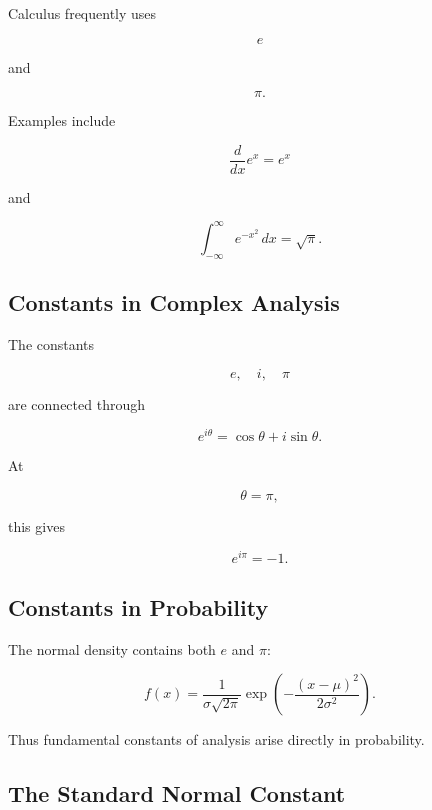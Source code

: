 Calculus frequently uses

\[
\boxed{
e
}
\]

and

\[
\boxed{
\pi.
}
\]

Examples include

\[
\boxed{
\frac{d}{dx}e^x=e^x
}
\]

and

\[
\boxed{
\int_{-\infty}^{\infty}
e^{-x^2}\,dx
=
\sqrt{\pi}.
}
\]

\subsection{Constants in Complex Analysis}
\label{subsec:constants-in-complex-analysis}

The constants

\[
\boxed{
e,
\quad
i,
\quad
\pi
}
\]

are connected through

\[
\boxed{
e^{i\theta}
=
\cos\theta+i\sin\theta.
}
\]

At

\[
\theta=\pi,
\]

this gives

\[
\boxed{
e^{i\pi}=-1.
}
\]

\subsection{Constants in Probability}
\label{subsec:constants-in-probability}

The normal density contains both \(e\) and \(\pi\):

\[
\boxed{
f(x)
=
\frac{1}{\sigma\sqrt{2\pi}}
\exp
\left(
-\frac{(x-\mu)^2}{2\sigma^2}
\right).
}
\]

Thus fundamental constants of analysis arise directly in probability.

\subsection{The Standard Normal Constant}
\label{subsec:standard-normal-constant}

